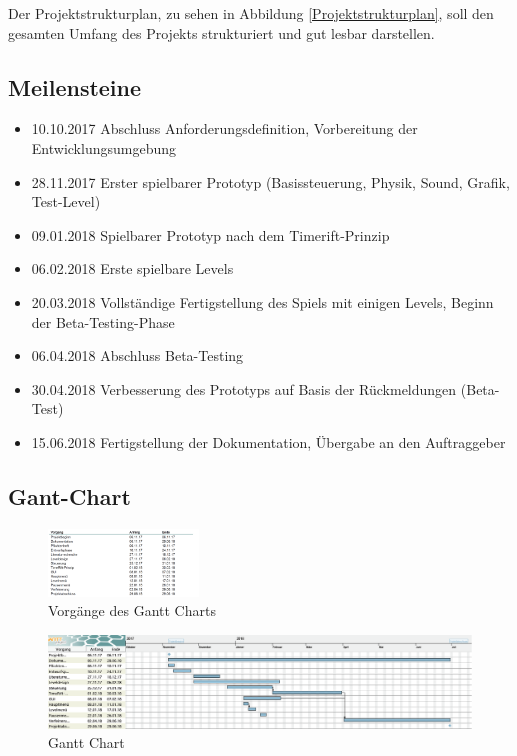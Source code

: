 Der Projektstrukturplan, zu sehen in Abbildung \ref{Projektstrukturplan}, soll den gesamten Umfang des Projekts strukturiert und gut lesbar darstellen.

\subsection{Meilensteine}\begin{itemize}
	\item 10.10.2017 Abschluss Anforderungsdefinition, Vorbereitung der Entwicklungsumgebung	
	\item 28.11.2017 Erster spielbarer Prototyp (Basissteuerung, Physik, Sound, Grafik, Test-Level)	
	\item 09.01.2018 Spielbarer Prototyp nach dem Timerift-Prinzip	
	\item 06.02.2018 Erste spielbare Levels	
	\item 20.03.2018 Vollständige Fertigstellung des Spiels mit einigen Levels, Beginn der Beta-Testing-Phase	
	\item 06.04.2018 Abschluss Beta-Testing	
	\item 30.04.2018 Verbesserung des Prototyps auf Basis der Rückmeldungen (Beta-Test)
	\item 15.06.2018 Fertigstellung der Dokumentation, Übergabe an den Auftraggeber
\end{itemize}
\subsection{Gant-Chart}
\begin{figure}[H]
	\centering
	\includegraphics[width=4cm]{images/Vorgaenge.png}
	\caption{Vorgänge des Gantt Charts}		
\end{figure}
\begin{figure}
	\centering
	\includegraphics[width=20cm]{images/Gantt.png}
	\caption{Gantt Chart}
\end{figure}

